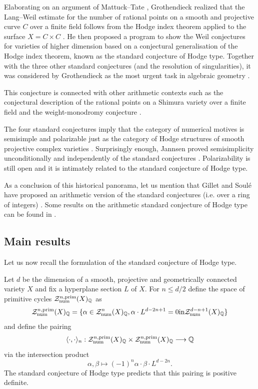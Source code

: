 Elaborating on an argument of Mattuck--Tate \cite {Mattuck}, Grothendieck  realized that the Lang--Weil estimate for the number of rational points on a smooth and projective curve $C$ over a finite field follows from the Hodge index theorem applied to the surface $X=C\times C$ \cite{Grothseg}. He then proposed a program to show the Weil conjectures for varieties of higher dimension based on a conjectural generalisation of the Hodge index theorem,  known as the standard conjecture of Hodge type. Together with the three other standard conjectures (and the resolution of singularities), it was considered by Grothendieck as the most urgent task in algebraic geometry \cite{GrothSC}.

This conjecture is connected with other arithmetic contexts such as the conjectural description of the rational points on a Shimura variety over a finite field \cite{LRSC} and the weight-monodromy conjecture \cite{mSaito}.

The four standard conjectures imply that the category of numerical motives   is semisimple and polarizable just as the category of Hodge structures of smooth projective complex varieties \cite{Rivano}. Surprisingly enough, Jannsen proved semisimplicity   unconditionally and independently of the standard conjectures \cite{Jann}. Polarizability is still open and it is intimately related to the standard conjecture of Hodge type.



 As a conclusion of this historical panorama, let us mention that Gillet and Soul\'e have proposed an arithmetic version of the standard conjectures (i.e. over a ring of integers) \cite{soule}. Some results on the arithmetic standard conjecture of Hodge type can be found in \cite{Kunz1,Kunz2,Kunz3,Kresch}.

  \subsection*{Main results}
  Let us now recall the formulation of the standard conjecture of Hodge type.
  \begin{conj}
\notready
  Let   $d$ be the dimension of   a smooth, projective and geometrically connected variety $X$ and fix a hyperplane section $L$ of $X$.  For $n \leq d/2$ define the space of primitive cycles $\mathcal{Z}^{n,\mathrm{prim}}_{\mathrm{num}}(X)_{\mathbb{Q}}$ as
\[\mathcal{Z}^{n,\mathrm{prim}}_{\mathrm{num}}(X)_{\mathbb{Q}} = \{\alpha \in \mathcal{Z}^{n}_{\mathrm{num}}(X)_{\mathbb{Q}} ,  \alpha \cdot L^ {{d-2n+1}}=0   \textrm{in}    \mathcal{Z}^{d-n+1}_{\mathrm{num}}(X)_{\mathbb{Q}}\}\]
and define the pairing
\[\langle \cdot, \cdot \rangle_{n} : \mathcal{Z}^{n,\mathrm{prim}}_{\mathrm{num}}(X)_{\mathbb{Q}}  \times  \mathcal{Z}^{n,\mathrm{prim}}_{\mathrm{num}}(X)_{\mathbb{Q}}  \longrightarrow \mathbb{Q}\]
 via the intersection product
 \[\alpha, \beta \mapsto  (-1)^n \alpha \cdot \beta \cdot L^{d-2n}.\]
The   standard conjecture of Hodge type predicts that this pairing is positive definite.
\end{conj}


